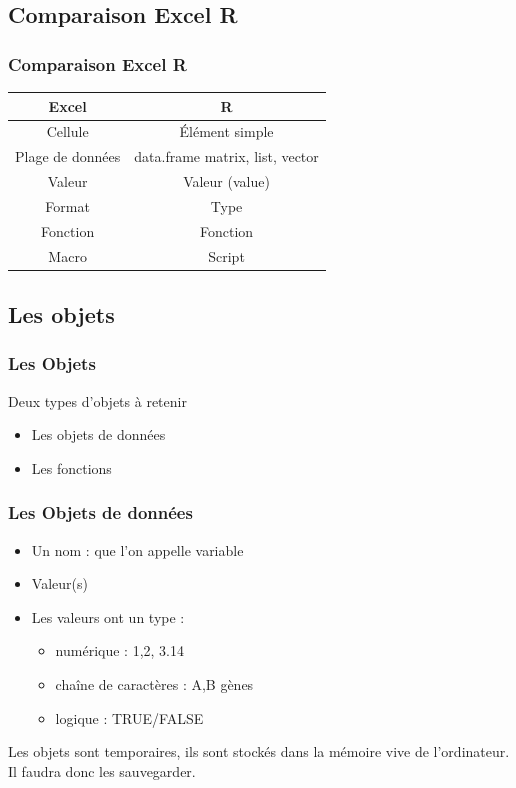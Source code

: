 \documentclass[handout, table,svgnames,hyperref={pdfpagemode=FullScreen}]{beamer}
\begin{document}
\subsection{Comparaison Excel R}
\begin{frame}
	\frametitle{Comparaison Excel R}
	\begin{center}
{
	\begin{tabular}[h]{cc}
		\hline
		\textbf{Excel} &  \textbf{R} \pause\\
		\hline 
		
		Cellule & Élément simple \\
		Plage de données & data.frame matrix, list, vector \pause\\
		\hline
		Valeur & Valeur (value) \\
		Format & Type \pause\\
		\hline
		Fonction & Fonction \\
		Macro & Script \\
		\hline
	\end{tabular}}
	\end{center}
\end{frame}
\subsection{Les objets}
\begin{frame}
	\frametitle{Les Objets}
	\begin{exampleblock}{Deux types d'objets à retenir}
	\begin{itemize}
		\item Les objets de données
		\item Les fonctions
	\end{itemize}
	\end{exampleblock}
\end{frame}
\begin{frame}
	\frametitle{Les Objets de données}
	\begin{itemize}
		\item Un nom : que l'on appelle  variable
		\item Valeur(s)
		\item Les valeurs ont un type : 
			\begin{itemize}
				\item numérique : 1,2, 3.14
				\item chaîne de caractères : A,B gènes
				\item logique : TRUE/FALSE
			\end{itemize}
	\end{itemize}
	Les objets sont temporaires, ils sont stockés dans la mémoire vive de l'ordinateur. Il faudra donc les sauvegarder.
\end{frame}
\end{document}
